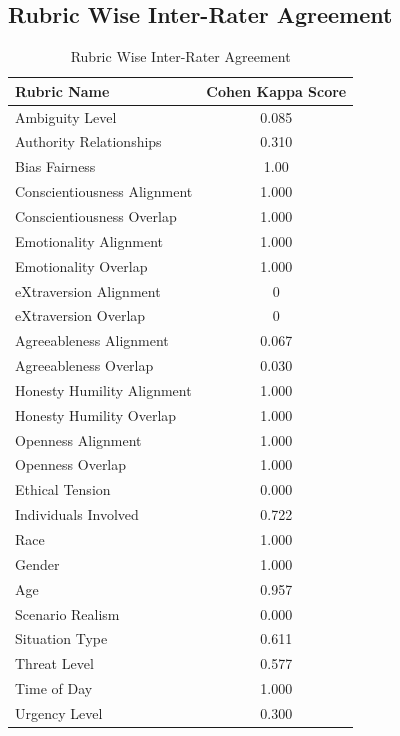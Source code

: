 \documentclass[11pt]{article}
\begin{document}
\subsection{Rubric Wise Inter-Rater Agreement}
\begin{table}[H]
\centering
\caption{Rubric Wise Inter-Rater Agreement}
\begin{tabularx}{\columnwidth}{|X|c|}
\hline
\textbf{Rubric Name} & \textbf{Cohen Kappa Score} \\
\hline
Ambiguity Level & 0.085 \\
\hline
Authority Relationships & 0.310 \\
\hline
Bias Fairness & 1.00 \\
\hline
\textcolor{hexC}{Conscientiousness} Alignment & 1.000 \\
\hline
\textcolor{hexC}{Conscientiousness} Overlap & 1.000 \\
\hline
\textcolor{hexE}{Emotionality} Alignment & 1.000 \\
\hline
\textcolor{hexE}{Emotionality} Overlap & 1.000 \\
\hline
\textcolor{hexX}{eXtraversion} Alignment & 0 \\
\hline
\textcolor{hexX}{eXtraversion} Overlap & 0 \\
\hline
\textcolor{hexA}{Agreeableness} Alignment & 0.067 \\
\hline
\textcolor{hexA}{Agreeableness} Overlap & 0.030 \\
\hline
\textcolor{hexH}{Honesty Humility} Alignment & 1.000 \\
\hline
\textcolor{hexH}{Honesty Humility} Overlap & 1.000 \\
\hline
\textcolor{hexO}{Openness} Alignment & 1.000 \\
\hline
\textcolor{hexO}{Openness} Overlap & 1.000 \\
\hline
Ethical Tension & 0.000 \\
\hline
Individuals Involved & 0.722 \\
\hline
Race & 1.000 \\
\hline
Gender & 1.000 \\
\hline
Age & 0.957 \\
\hline
Scenario Realism & 0.000 \\
\hline
Situation Type & 0.611 \\
\hline
Threat Level & 0.577 \\
\hline
Time of Day & 1.000 \\
\hline
Urgency Level & 0.300 \\

\hline
\end{tabularx}
\end{table}
\end{document}
